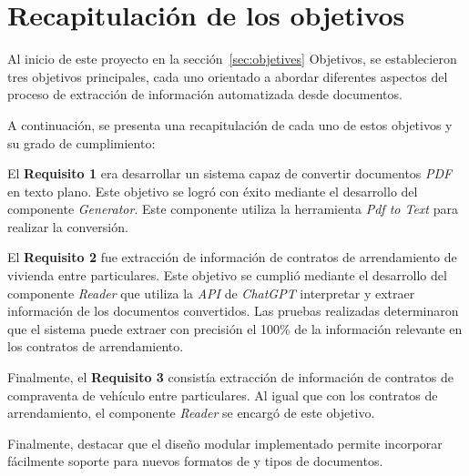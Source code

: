 \section{Recapitulación de los objetivos}

Al inicio de este proyecto en la sección~\ref{sec:objetives} Objetivos, se establecieron tres objetivos principales,
cada uno orientado a abordar diferentes aspectos del proceso de extracción de información automatizada desde documentos.

A continuación, se presenta una recapitulación de cada uno de estos objetivos y su grado de cumplimiento:

El \textbf{Requisito 1} era desarrollar un sistema capaz de convertir documentos \textit{PDF} en texto plano.
Este objetivo se logró con éxito mediante el desarrollo del componente \textit{Generator}.
Este componente utiliza la herramienta \textit{Pdf to Text} para realizar la conversión.

El \textbf{Requisito 2} fue extracción de información de contratos de arrendamiento de vivienda entre particulares.
Este objetivo se cumplió mediante el desarrollo del componente \textit{Reader} que utiliza la \textit{API}
de \textit{ChatGPT} interpretar y extraer información de los documentos convertidos.
Las pruebas realizadas determinaron que el sistema puede extraer con precisión el 100\% de la información relevante
en los contratos de arrendamiento.

Finalmente, el \textbf{Requisito 3} consistía extracción de información de contratos de compraventa de vehículo entre
particulares.
Al igual que con los contratos de arrendamiento, el componente \textit{Reader} se encargó de este objetivo.

Finalmente, destacar que el diseño modular implementado permite incorporar fácilmente soporte para nuevos formatos de y
tipos de documentos.